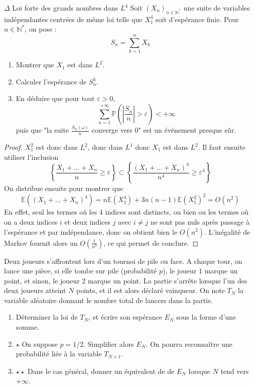\documentclass[french,a4paper]{article}
\renewcommand{\P}{\mathbb{P}}
\newcommand{\N}{\mathbb{N}}
\newcommand{\st}{^*}
\newcommand{\E}{\mathbb{E}}
\theoremstyle{plain}
\theoremstyle{definition}
\theoremstyle{remark}
\begin{document}
\begin{ex}{$\Delta$ Loi forte des grands nombres dans $L^4$}
	Soit $(X_n)_{n\in\N\st}$ une suite de variables indépendantes centrées de même loi telle que $X_1^4$ soit d'espérance finie. Pour $n\in\N\st$, on pose : $$S_n=\sum_{k=1}^{n}X_k$$
	\begin{enumerate}
		\item Montrer que $X_1$ est dans $L^2$.
		\item Calculer l'espérance de $S_n^4$.
		\item En déduire que pour tout $\varepsilon>0$, $$\sum_{n=1}^{+\infty}\P\left(\left\lvert\frac{S_n}{n}\right\rvert>\varepsilon\right)<+\infty$$ puis que "la suite $\displaystyle\frac{S_n(\omega)}{n}$ converge vers $0$" est un événement presque sûr. 
	\end{enumerate}
\end{ex}
\begin{proof}
	$X_1^2$ est donc dans $L^2$, donc dans $L^1$ donc $X_1$ est dans $L^2$. Il faut ensuite utiliser l'inclusion $$\left\{\frac{X_1+\ldots+X_n}{n}\geqslant\varepsilon\right\}\subset \left\{\frac{\left(X_1+\ldots+X_n\right)^4}{n^4}\geqslant\varepsilon^4\right\}$$ On distribue ensuite pour montrer que  $$\E\left((X_1+\ldots+X_n)^4\right)=n\E(X_1^4)+3n(n-1)\E(X_1^2)^2=O(n^2)$$ En effet, seul les termes où les 4 indices sont distincts, ou bien ou les termes où on a deux indices $i$ et deux indices $j$ avec $i\ne j$ ne sont pas nuls après passage à l'espérance et par indépendance, donc on obtient bien le $O(n^2)$. L'inégalité de Markov fournit alors un $O\left(\displaystyle\frac{1}{n^2}\right)$, ce qui permet de conclure.
\end{proof}

\begin{ex}{}
	Deux joueurs s'affrontent lors d'un tournoi de pile ou face. A chaque tour, on lance une pièce, si elle tombe sur pile (probabilité $p$), le joueur $1$ marque un point, et sinon, le joueur $2$ marque un point. La partie s'arrête lorsque l'un des deux joueurs atteint $N$ points, et il est alors déclaré vainqueur. On note $T_N$ la variable aléatoire donnant le nombre total de lancers dans la partie.
	\begin{enumerate}
		\item Déterminer la loi de $T_N$, et écrire son espérance $E_N$ sous la forme d'une somme.
		\item $\star$ On suppose $p=1/2$. Simplifier alors $E_N$. On pourra reconnaître une probabilité liée à la variable $T_{N+1}$.
		\item $\star\star$ Dans le cas général, donner un équivalent de de $E_N$ lorsque $N$ tend vers $+\infty$.
	\end{enumerate}
\end{ex}
\end{document}

